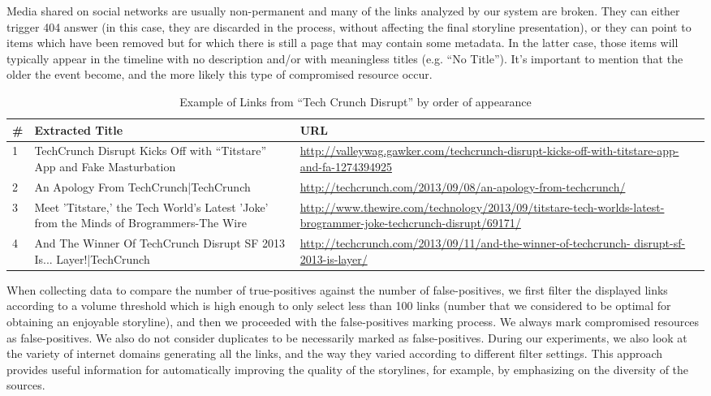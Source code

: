 \documentclass{sig-alternate}
\begin{document}
Media shared on social networks are usually non-permanent and many of the links analyzed by our system are broken. They can either trigger 404 answer (in this case, they are discarded in the process, without affecting the final storyline presentation), or they can point to items which have been removed but for which there is still a page that may contain some metadata. In the latter case, those items will typically appear in the timeline with no description and/or with meaningless titles (e.g. ``No Title''). It's important to mention that the older the event become, and the more likely this type of compromised resource occur.

\begin{table}[htbp]
\begin{tabular}{| p{0.2cm} | p{3.5cm} | p{3.8cm} |}
  \hline
  \textbf{\#} & \textbf{Extracted Title} & \textbf{URL} \\
  \hline
  1 & TechCrunch Disrupt Kicks Off with ``Titstare'' App and Fake Masturbation & \url{http://valleywag.gawker.com/techcrunch-disrupt-kicks-off-with-titstare-app-and-fa-1274394925} \\
\hline
  2 & An Apology From TechCrunch|TechCrunch & \url{http://techcrunch.com/2013/09/08/an-apology-from-techcrunch/} \\
\hline
  3 & Meet 'Titstare,' the Tech World's Latest 'Joke' from the Minds of Brogrammers-The Wire &\url{http://www.thewire.com/technology/2013/09/titstare-tech-worlds-latest-brogrammer-joke-techcrunch-disrupt/69171/} \\
\hline
  4 & And The Winner Of TechCrunch Disrupt SF 2013 Is... Layer!|TechCrunch &\url{http://techcrunch.com/2013/09/11/and-the-winner-of-techcrunch- disrupt-sf-2013-is-layer/} \\
\hline
\end{tabular}
\caption{Example of Links from ``Tech Crunch Disrupt'' by order of appearance}
\label{tab:tcdisrupt}
\end{table}

When collecting data to compare the number of true-positives against the number of false-positives, we first filter the displayed links according to a volume threshold which is high enough to only select less than 100 links (number that we considered to be optimal for obtaining an enjoyable storyline), and then we proceeded with the false-positives marking process. We always mark compromised resources as false-positives. We also do not consider duplicates to be necessarily marked as false-positives. During our experiments, we also look at the variety of internet domains generating all the links, and the way they varied according to different filter settings. This approach provides useful information for automatically improving the quality of the storylines, for example, by emphasizing on the diversity of the sources.
\end{document}
